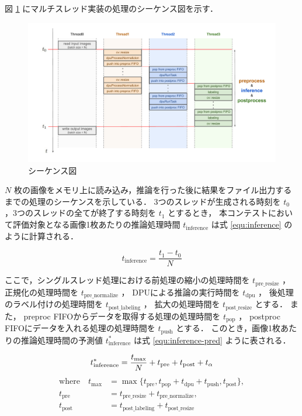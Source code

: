 図 \ref{fig:sequence} にマルチスレッド実装の処理のシーケンス図を示す．

\begin{figure}[h]
  \begin{center}
    \includegraphics[width=\linewidth]{figures/sw_opt_sequence.pdf}
    \caption{シーケンス図}
    \label{fig:sequence}
  \end{center}
\end{figure}

$N$ 枚の画像をメモリ上に読み込み，推論を行った後に結果をファイル出力するまでの処理のシーケンスを示している．
3つのスレッドが生成される時刻を $t_0$ ，3つのスレッドの全てが終了する時刻を $t_1$ とするとき，
本コンテストにおいて評価対象となる画像1枚あたりの推論処理時間 $t_{\mathrm{inference}}$ は式 \ref{equ:inference} のように計算される．

\begin{equation}
  \label{equ:inference}
  t_{\mathrm{inference}} = \frac{t_1 - t_0}{N}
\end{equation}

ここで，シングルスレッド処理における前処理の縮小の処理時間を $t_{\mathrm{pre\_resize}}$ ，
正規化の処理時間を $t_{\mathrm{pre\_normalize}}$ ，
DPUによる推論の実行時間を $t_{\mathrm{dpu}}$ ，
後処理のラベル付けの処理時間を $t_{\mathrm{post\_labeling}}$ ，
拡大の処理時間を $t_{\mathrm{post\_resize}}$ とする．
また，
preproc FIFOからデータを取得する処理の処理時間を $t_{\mathrm{pop}}$ ，
postproc FIFOにデータを入れる処理の処理時間を $t_{\mathrm{push}}$ とする．
このとき，画像1枚あたりの推論処理時間の予測値 $t_{\mathrm{inference}}^*$ は式 \ref{equ:inference-pred} ように表される．

\begin{equation}
  \label{equ:inference-pred}
    t_{\mathrm{inference}}^* = \frac{t_{\mathrm{max}}}{N} + t_{\mathrm{pre}} + t_{\mathrm{post}} + t_\alpha \\
\end{equation}
\begin{equation*}
    \begin{split}
      \text{where} \quad t_{\mathrm{max}} &= \max \{t_{\mathrm{pre}}, t_{\mathrm{pop}} + t_{\mathrm{dpu}} + t_{\mathrm{push}}, t_{\mathrm{post}}\}, \\
      t_{\mathrm{pre}} &= t_{\mathrm{pre\_resize}} + t_{\mathrm{pre\_normalize}}, \\
      t_{\mathrm{post}} &= t_{\mathrm{post\_labeling}} + t_{\mathrm{post\_resize}}
    \end{split}
\end{equation*}


